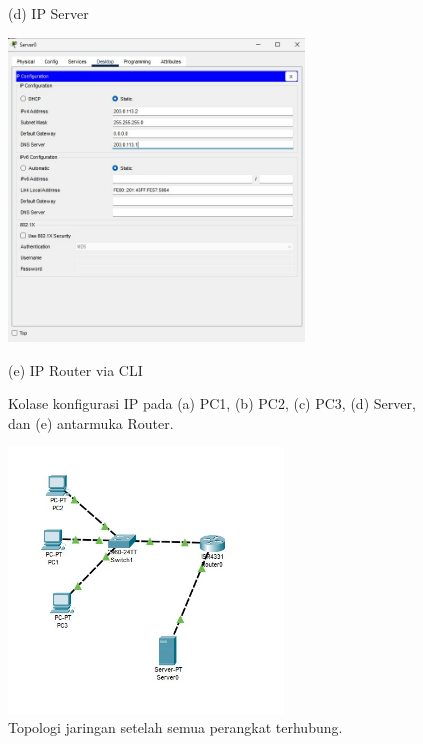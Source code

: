\begin{enumerate}
\begin{figure}[H]
\begin{minipage}{0.48\textwidth}
            \caption*{(d) IP Server}
        \end{minipage}\hfill
        \begin{minipage}{0.48\textwidth}
            \centering
            \includegraphics[width=0.7\textwidth]{img4/IPCServer.jpeg}
            \caption*{(e) IP Router via CLI}
        \end{minipage}
        \caption{Kolase konfigurasi IP pada (a) PC1, (b) PC2, (c) PC3, (d) Server, dan (e) antarmuka Router.}
    \end{figure}
    
    \begin{figure}[H]
        \centering
        \includegraphics[width=0.65\textwidth]{img4/topoconnect.jpeg}
        \caption{Topologi jaringan setelah semua perangkat terhubung.}
    \end{figure}


\end{enumerate}
